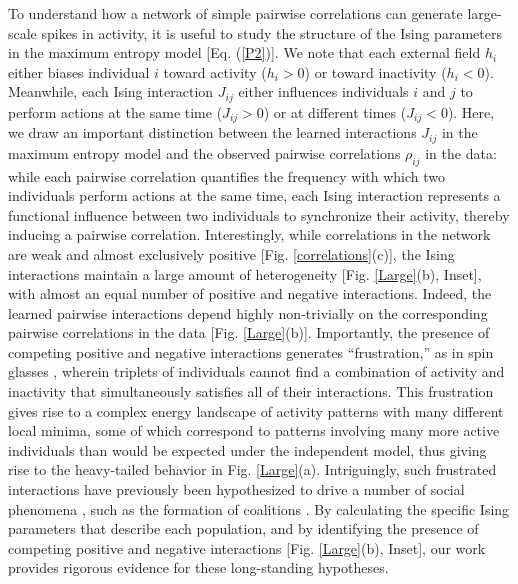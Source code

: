 \documentclass[aps,reprint,superscriptaddress,amsmath,amssymb,longbibliography]{revtex4-1}
\begin{document}
To understand how a network of simple pairwise correlations can generate large-scale spikes in activity, it is useful to study the structure of the Ising parameters in the maximum entropy model [Eq. (\ref{P2})]. We note that each external field $h_i$ either biases individual $i$ toward activity ($h_i > 0$) or toward inactivity ($h_i < 0$). Meanwhile, each Ising interaction $J_{ij}$ either influences individuals $i$ and $j$ to perform actions at the same time ($J_{ij}>0$) or at different times ($J_{ij} < 0$). Here, we draw an important distinction between the learned interactions $J_{ij}$ in the maximum entropy model and the observed pairwise correlations $\rho_{ij}$ in the data: while each pairwise correlation quantifies the frequency with which two individuals perform actions at the same time, each Ising interaction represents a functional influence between two individuals to synchronize their activity, thereby inducing a pairwise correlation. Interestingly, while correlations in the network are weak and almost exclusively positive [Fig. \ref{correlations}(c)], the Ising interactions maintain a large amount of heterogeneity [Fig. \ref{Large}(b), Inset], with almost an equal number of positive and negative interactions. Indeed, the learned pairwise interactions depend highly non-trivially on the corresponding pairwise correlations in the data [Fig. \ref{Large}(b)]. Importantly, the presence of competing positive and negative interactions generates ``frustration,'' as in spin glasses \cite{Mezard-01}, wherein triplets of individuals cannot find a combination of activity and inactivity that simultaneously satisfies all of their interactions. This frustration gives rise to a complex energy landscape of activity patterns with many different local minima, some of which correspond to patterns involving many more active individuals than would be expected under the independent model, thus giving rise to the heavy-tailed behavior in Fig. \ref{Large}(a). Intriguingly, such frustrated interactions have previously been hypothesized to drive a number of social phenomena \cite{Castellano-01}, such as the formation of coalitions \cite{Galam-06}. By calculating the specific Ising parameters that describe each population, and by identifying the presence of competing positive and negative interactions [Fig. \ref{Large}(b), Inset], our work provides rigorous evidence for these long-standing hypotheses.
\end{document}

